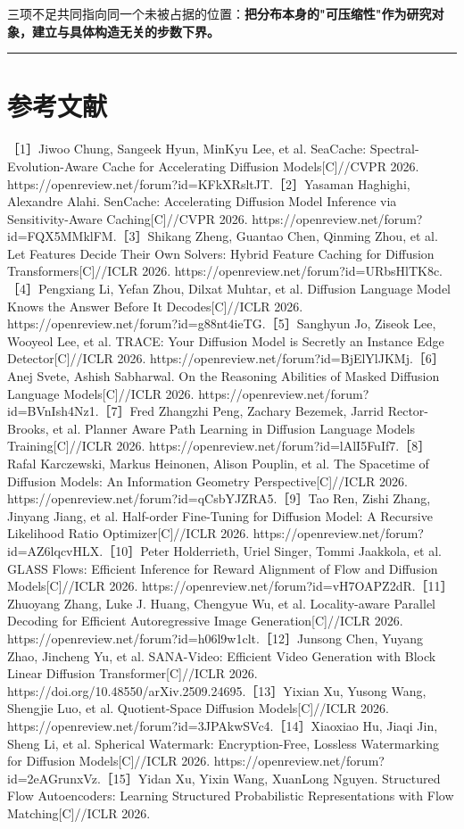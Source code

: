 \documentclass[12pt,a4paper]{ctexart}
\begin{document}
三项不足共同指向同一个未被占据的位置：\textbf{把分布本身的"可压缩性"作为研究对象，建立与具体构造无关的步数下界。}

\vspace{4pt}\noindent\rule{\linewidth}{0.4pt}\vspace{4pt}

\section*{参考文献}

［1］Jiwoo Chung, Sangeek Hyun, MinKyu Lee, et al. SeaCache: Spectral-Evolution-Aware Cache for Accelerating Diffusion Models[C]//CVPR 2026. https://openreview.net/forum?id=KFkXRsltJT.［2］Yasaman Haghighi, Alexandre Alahi. SenCache: Accelerating Diffusion Model Inference via Sensitivity-Aware Caching[C]//CVPR 2026. https://openreview.net/forum?id=FQX5MMklFM.［3］Shikang Zheng, Guantao Chen, Qinming Zhou, et al. Let Features Decide Their Own Solvers: Hybrid Feature Caching for Diffusion Transformers[C]//ICLR 2026. https://openreview.net/forum?id=URbsHlTK8c.［4］Pengxiang Li, Yefan Zhou, Dilxat Muhtar, et al. Diffusion Language Model Knows the Answer Before It Decodes[C]//ICLR 2026. https://openreview.net/forum?id=g88nt4ieTG.［5］Sanghyun Jo, Ziseok Lee, Wooyeol Lee, et al. TRACE: Your Diffusion Model is Secretly an Instance Edge Detector[C]//ICLR 2026. https://openreview.net/forum?id=BjElYlJKMj.［6］Anej Svete, Ashish Sabharwal. On the Reasoning Abilities of Masked Diffusion Language Models[C]//ICLR 2026. https://openreview.net/forum?id=BVnIsh4Nz1.［7］Fred Zhangzhi Peng, Zachary Bezemek, Jarrid Rector-Brooks, et al. Planner Aware Path Learning in Diffusion Language Models Training[C]//ICLR 2026. https://openreview.net/forum?id=lAlI5FuIf7.［8］Rafal Karczewski, Markus Heinonen, Alison Pouplin, et al. The Spacetime of Diffusion Models: An Information Geometry Perspective[C]//ICLR 2026. https://openreview.net/forum?id=qCsbYJZRA5.［9］Tao Ren, Zishi Zhang, Jinyang Jiang, et al. Half-order Fine-Tuning for Diffusion Model: A Recursive Likelihood Ratio Optimizer[C]//ICLR 2026. https://openreview.net/forum?id=AZ6lqcvHLX.［10］Peter Holderrieth, Uriel Singer, Tommi Jaakkola, et al. GLASS Flows: Efficient Inference for Reward Alignment of Flow and Diffusion Models[C]//ICLR 2026. https://openreview.net/forum?id=vH7OAPZ2dR.［11］Zhuoyang Zhang, Luke J. Huang, Chengyue Wu, et al. Locality-aware Parallel Decoding for Efficient Autoregressive Image Generation[C]//ICLR 2026. https://openreview.net/forum?id=h06l9w1clt.［12］Junsong Chen, Yuyang Zhao, Jincheng Yu, et al. SANA-Video: Efficient Video Generation with Block Linear Diffusion Transformer[C]//ICLR 2026. https://doi.org/10.48550/arXiv.2509.24695.［13］Yixian Xu, Yusong Wang, Shengjie Luo, et al. Quotient-Space Diffusion Models[C]//ICLR 2026. https://openreview.net/forum?id=3JPAkwSVc4.［14］Xiaoxiao Hu, Jiaqi Jin, Sheng Li, et al. Spherical Watermark: Encryption-Free, Lossless Watermarking for Diffusion Models[C]//ICLR 2026. https://openreview.net/forum?id=2eAGrunxVz.［15］Yidan Xu, Yixin Wang, XuanLong Nguyen. Structured Flow Autoencoders: Learning Structured Probabilistic Representations with Flow Matching[C]//ICLR 2026. 
\end{document}
